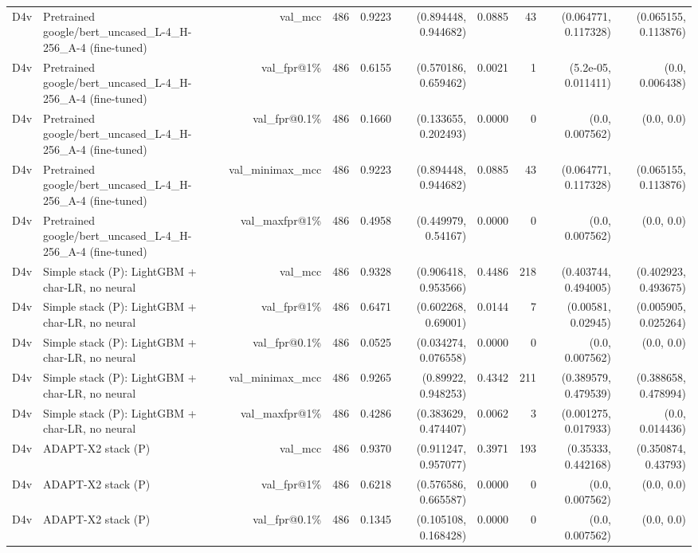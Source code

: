 \begin{table}[t]
\begin{tabular}{llrrrrrrrr}
D4v & Pretrained google/bert\_uncased\_L-4\_H-256\_A-4 (fine-tuned) & val\_mcc & 486 & 0.9223 & (0.894448, 0.944682) & 0.0885 & 43 & (0.064771, 0.117328) & (0.065155, 0.113876) \\
D4v & Pretrained google/bert\_uncased\_L-4\_H-256\_A-4 (fine-tuned) & val\_fpr@1\% & 486 & 0.6155 & (0.570186, 0.659462) & 0.0021 & 1 & (5.2e-05, 0.011411) & (0.0, 0.006438) \\
D4v & Pretrained google/bert\_uncased\_L-4\_H-256\_A-4 (fine-tuned) & val\_fpr@0.1\% & 486 & 0.1660 & (0.133655, 0.202493) & 0.0000 & 0 & (0.0, 0.007562) & (0.0, 0.0) \\
D4v & Pretrained google/bert\_uncased\_L-4\_H-256\_A-4 (fine-tuned) & val\_minimax\_mcc & 486 & 0.9223 & (0.894448, 0.944682) & 0.0885 & 43 & (0.064771, 0.117328) & (0.065155, 0.113876) \\
D4v & Pretrained google/bert\_uncased\_L-4\_H-256\_A-4 (fine-tuned) & val\_maxfpr@1\% & 486 & 0.4958 & (0.449979, 0.54167) & 0.0000 & 0 & (0.0, 0.007562) & (0.0, 0.0) \\
D4v & Simple stack (P): LightGBM + char-LR, no neural & val\_mcc & 486 & 0.9328 & (0.906418, 0.953566) & 0.4486 & 218 & (0.403744, 0.494005) & (0.402923, 0.493675) \\
D4v & Simple stack (P): LightGBM + char-LR, no neural & val\_fpr@1\% & 486 & 0.6471 & (0.602268, 0.69001) & 0.0144 & 7 & (0.00581, 0.02945) & (0.005905, 0.025264) \\
D4v & Simple stack (P): LightGBM + char-LR, no neural & val\_fpr@0.1\% & 486 & 0.0525 & (0.034274, 0.076558) & 0.0000 & 0 & (0.0, 0.007562) & (0.0, 0.0) \\
D4v & Simple stack (P): LightGBM + char-LR, no neural & val\_minimax\_mcc & 486 & 0.9265 & (0.89922, 0.948253) & 0.4342 & 211 & (0.389579, 0.479539) & (0.388658, 0.478994) \\
D4v & Simple stack (P): LightGBM + char-LR, no neural & val\_maxfpr@1\% & 486 & 0.4286 & (0.383629, 0.474407) & 0.0062 & 3 & (0.001275, 0.017933) & (0.0, 0.014436) \\
D4v & ADAPT-X2 stack (P) & val\_mcc & 486 & 0.9370 & (0.911247, 0.957077) & 0.3971 & 193 & (0.35333, 0.442168) & (0.350874, 0.43793) \\
D4v & ADAPT-X2 stack (P) & val\_fpr@1\% & 486 & 0.6218 & (0.576586, 0.665587) & 0.0000 & 0 & (0.0, 0.007562) & (0.0, 0.0) \\
D4v & ADAPT-X2 stack (P) & val\_fpr@0.1\% & 486 & 0.1345 & (0.105108, 0.168428) & 0.0000 & 0 & (0.0, 0.007562) & (0.0, 0.0) \\

\end{tabular}
\end{table}
